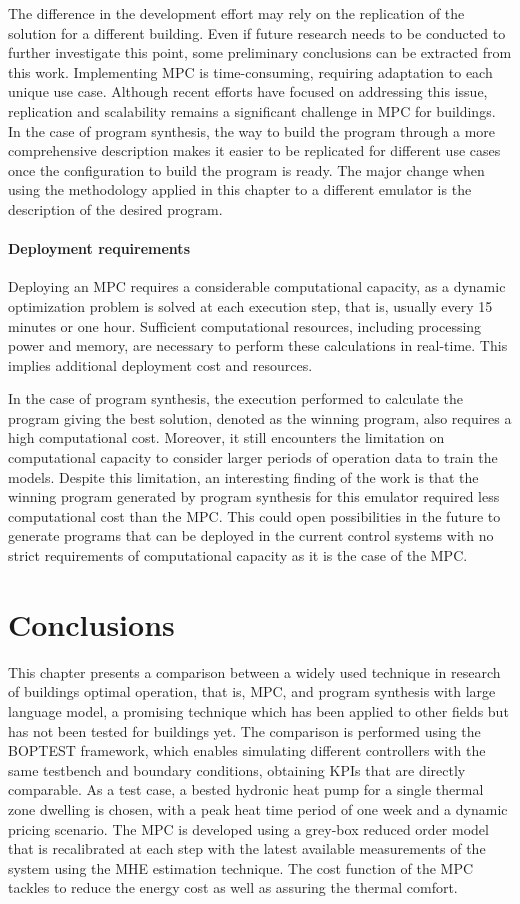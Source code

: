 The difference in the development effort may rely on the replication of the solution for a different building. Even if future research needs to be conducted to further investigate this point, some preliminary conclusions can be extracted from this work. Implementing MPC is time-consuming, requiring adaptation to each unique use case. Although recent efforts have focused on addressing this issue, replication and scalability remains a significant challenge in MPC for buildings. In the case of program synthesis, the way to build the program through a more comprehensive description makes it easier to be replicated for different use cases once the configuration to build the program is ready. The major change when using the methodology applied in this chapter to a different emulator is the description of the desired program.

\paragraph{Deployment requirements}
Deploying an MPC requires a considerable computational capacity, as a dynamic optimization problem is solved at each execution step, that is, usually every 15 minutes or one hour. Sufficient computational resources, including processing power and memory, are necessary to perform these calculations in real-time. This implies additional deployment cost and resources.

In the case of program synthesis, the execution performed to calculate the program giving the best solution, denoted as the winning program, also requires a high computational cost. Moreover, it still encounters the limitation on computational capacity to consider larger periods of operation data to train the models. Despite this limitation, an interesting finding of the work is that the winning program generated by program synthesis for this emulator required less computational cost than the MPC. This could open possibilities in the future to generate programs that can be deployed in the current control systems with no strict requirements of computational capacity as it is the case of the MPC.

\section{Conclusions}
\label{sec:conclusion}
This chapter presents a comparison between a widely used technique in research of buildings optimal operation, that is, MPC, and program synthesis with large language model, a promising technique which has been applied to other fields but has not been tested for buildings yet. The comparison is performed using the BOPTEST framework, which enables simulating different controllers with the same testbench and boundary conditions, obtaining KPIs that are directly comparable. As a test case, a bested hydronic heat pump for a single thermal zone dwelling is chosen, with a peak heat time period of one week and a dynamic pricing scenario. The MPC is developed using a grey-box reduced order model that is recalibrated at each step with the latest available measurements of the system using the MHE estimation technique. The cost function of the MPC tackles to reduce the energy cost as well as assuring the thermal comfort. 

